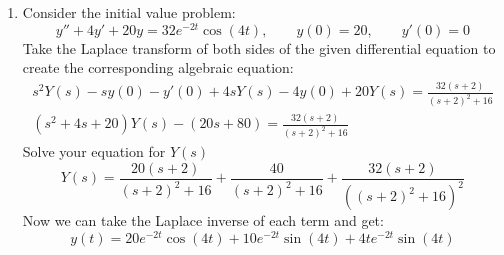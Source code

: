 \documentclass[12pt]{article}
\begin{document}
\begin{enumerate}[label = (\alph*)]
		\item Consider the initial value problem:
			$$
			y''  + 4y'  + 20y = 32e^{-2t}\cos(4t), \qquad y(0) = 20, \qquad y'(0) = 0
			$$
		Take the Laplace transform of both sides of the given differential equation to create the corresponding algebraic equation:
			\begin{align*}
				s^2Y(s) - sy(0) - y'(0) + 4sY(s) - 4y(0) + 20Y(s) = \frac{32(s+2)}{(s+2)^2 + 16} \\
				(s^2 + 4s + 20)Y(s) - (20s + 80) = \frac{32(s+2)}{(s+2)^2 + 16} 
			\end{align*}
		Solve your equation for $Y(s)$
			$$
			Y(s) = \frac{20(s+2)}{(s+2)^2 + 16} + \frac{40}{(s+2)^2 + 16} + \frac{32(s+2)}{((s+2)^2 + 16)^2}
			$$
		Now we can take the Laplace inverse of each term and get:
			\boldmath
			$$
			y(t) = 20e^{-2t}\cos(4t) + 10e^{-2t}\sin(4t) + 4te^{-2t}\sin(4t)
			$$
			\unboldmath
	\end{enumerate}
\end{document}
